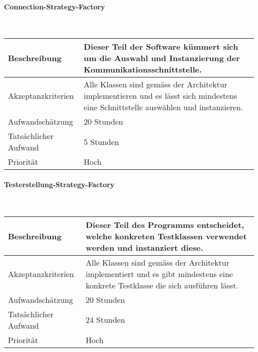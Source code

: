 \documentclass[]{subfiles}
\begin{document}
        \paragraph*{Connection-Strategy-Factory}\mbox{} \\
        \begin{tabularx}{\textwidth}{lX}
            \toprule
            Beschreibung & Dieser Teil der Software kümmert sich um die Auswahl und Instanzierung der Kommunikationsschnittstelle.\\
            \midrule
            Akzeptanzkriterien & Alle Klassen sind gemäss der Architektur implementieren und es lässt sich mindestens eine Schnittstelle auswählen und instanzieren.\\
            \midrule
            Aufwandschätzung & 20 Stunden\\
            Tatsächlicher Aufwand & 5 Stunden\\ 
            \midrule
            Priorität & Hoch\\
            \bottomrule
        \end{tabularx}
    
        \paragraph*{Testerstellung-Strategy-Factory}\mbox{} \\
        \begin{tabularx}{\textwidth}{lX}
            \toprule
            Beschreibung & Dieser Teil des Programms entscheidet, welche konkreten Testklassen verwendet werden und instanziert diese.\\
            \midrule
            Akzeptanzkriterien & Alle Klassen sind gemäss der Architektur implementiert und es gibt mindestens eine konkrete Testklasse die sich ausführen lässt. \\
            \midrule
            Aufwandschätzung & 20 Stunden\\
            Tatsächlicher Aufwand & 24 Stunden\\ 
            \midrule
            Priorität & Hoch\\
            \bottomrule
        \end{tabularx}
        \newpage
    
    
\end{document}
